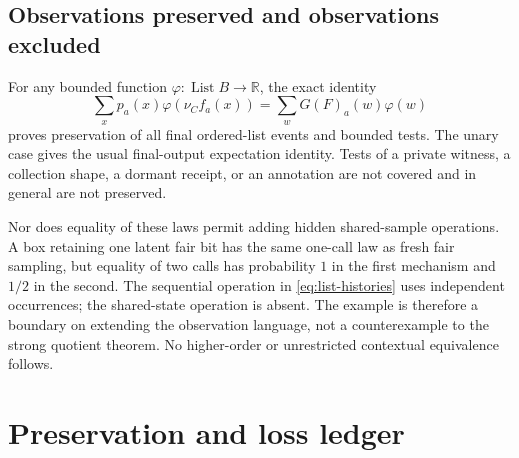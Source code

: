 \documentclass[11pt,a4paper]{article}
\theoremstyle{definition}
\newcommand{\List}{\operatorname{List}}
\begin{document}
\subsection{Observations preserved and observations excluded}
For any bounded function $\varphi:\List B\to\mathbb R$, the exact identity
\[
 \sum_xp_a(x)\varphi(\nu_Cf_a(x))
       =\sum_wG(F)_a(w)\varphi(w)
\]
proves preservation of all final ordered-list events and bounded tests.
The unary case gives the usual final-output expectation identity.
Tests of a private witness, a collection shape, a dormant receipt, or an
annotation are not covered and in general are not preserved.

Nor does equality of these laws permit adding hidden shared-sample
operations. A box retaining one latent fair bit has the same one-call law
as fresh fair sampling, but equality of two calls has probability $1$ in
the first mechanism and $1/2$ in the second. The sequential operation in
\eqref{eq:list-histories} uses independent occurrences; the shared-state
operation is absent. The example is therefore a boundary on extending the
observation language, not a counterexample to the strong quotient theorem.
No higher-order or unrestricted contextual equivalence follows.

\section{Preservation and loss ledger}\label{sec:ledger}
\end{document}
